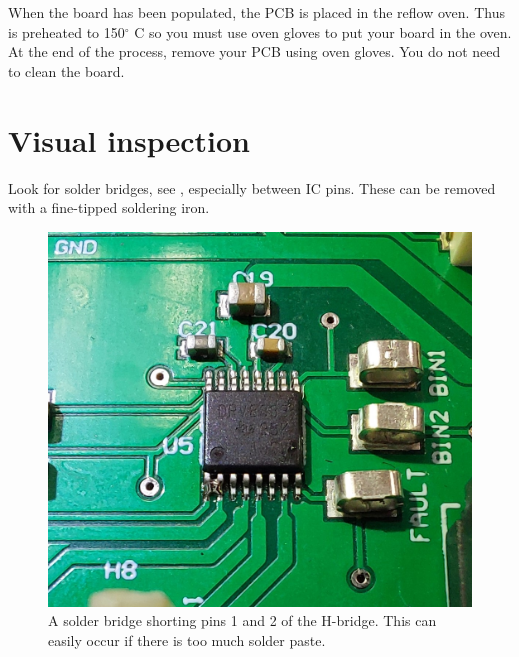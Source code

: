 When the board has been populated, the PCB is placed in the reflow
oven.  Thus is preheated to 150$^{\circ}$ C so you must use oven gloves to
put your board in the oven.  At the end of the process, remove your
PCB using oven gloves.  You do not need to clean the board.


\section{Visual inspection}

Look for solder bridges, see ,
especially between IC pins.  These can be removed with a fine-tipped
soldering iron.

\begin{figure}[!h]
  \centering
  \includegraphics[width=6in]{figs/solder_bridge.jpg}
  \caption{A solder bridge shorting pins 1 and 2 of the H-bridge.
    This can easily occur if there is too much solder paste.}
  \label{fig:solder_bridge}
\end{figure}
